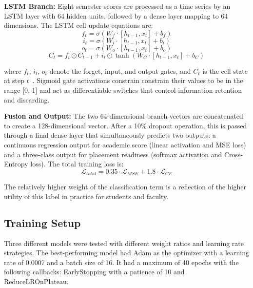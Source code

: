\documentclass[conference]{IEEEtran}
\begin{document}
\textbf{LSTM Branch:} Eight semester scores are processed as a time series by an LSTM layer with 64 hidden units, followed by a dense layer mapping to 64 dimensions. The LSTM cell update equations are:
\begin{equation}
f_t = \sigma(W_f \cdot [h_{t-1}, x_t] + b_f)
\end{equation}
\begin{equation}
i_t = \sigma(W_i \cdot [h_{t-1}, x_t] + b_i)
\end{equation}
\begin{equation}
o_t = \sigma(W_o \cdot [h_{t-1}, x_t] + b_o)
\end{equation}
\begin{equation}
C_t = f_t \odot C_{t-1} + i_t \odot \tanh(W_C \cdot [h_{t-1}, x_t] + b_C)
\end{equation}

where $f_t$, $i_t$, $o_t$ denote the forget, input, and output gates, and $C_t$ is the cell state at step $t$~\cite{R5}. Sigmoid gate activations constrain constrain their values to be in the range [0, 1] and act as differentiable switches
that control information retention and discarding.

\textbf{Fusion and Output:} The two 64-dimensional branch vectors are concatenated to create a 128-dimensional vector. After a 10\% dropout operation, this is passed through a final dense layer that simultaneously predicts two outputs: a continuous regression output for academic score (linear activation and MSE loss) and a three-class output for placement readiness (softmax activation and Cross-Entropy loss). The total training loss is:
\begin{equation}
\mathcal{L}_{total} = 0.35 \cdot \mathcal{L}_{MSE} + 1.8 \cdot \mathcal{L}_{CE}
\end{equation}

The relatively higher weight of the classification term is a reflection of the higher utility of this label in practice for students and faculty.

\subsection{Training Setup}

Three different models were tested with different weight ratios and learning rate strategies. The best-performing model had Adam as the optimizer with a learning rate of 0.0007 and a batch size of 16. It had a maximum of 40 epochs with the following callbacks: EarlyStopping with a patience of 10 and ReduceLROnPlateau.
\end{document}
